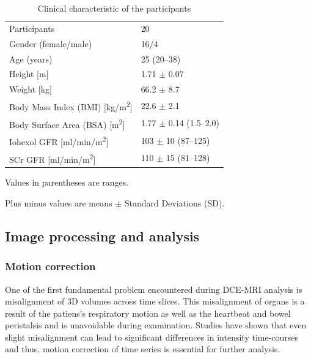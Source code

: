 \begin{table}[h!]
\centering
\caption[Clinical characteristic of the participants]{Clinical characteristic of the participants \cite{eikefjord2017dynamic}}
\label{tab:participants}
\begin{threeparttable}
\renewcommand{\arraystretch}{1.25}
\begin{tabular}{m{7cm} m{4cm}}
	\toprule

 	Participants & 20\\
  	Gender (female/male) &16/4\\
  	Age (years) & 25 (20--38)\\
  	Height [m] & 1.71 $\pm$ 0.07\\
  	Weight [kg] & 66.2 $\pm$ 8.7\\
  	Body Mass Index (BMI) [kg/m\textsuperscript{2}] & 22.6 $\pm$ 2.1\\
  	Body Surface Area (BSA) [m\textsuperscript{2}]& 1.77 $\pm$ 0.14 (1.5--2.0) \\
  	Iohexol GFR [ml/min/m\textsuperscript{2}] &103 $\pm$ 10 (87--125)\\
  	SCr GFR [ml/min/m\textsuperscript{2}] & 110 $\pm$ 15 (81--128)\\
  \bottomrule

\end{tabular}
\begin{tablenotes}%
\footnotesize{}%
\item Values in parentheses are ranges.
\item Plus minus values are means $\pm$ Standard Deviations (SD).
    \end{tablenotes}
	\end{threeparttable}
\end{table}

\subsection{Image processing and analysis}

\subsubsection{Motion correction}
One of the first fundamental problem encountered during DCE-MRI analysis is misalignment of 3D volumes across time slices. This misalignment of organs is a result of the patiens's respiratory motion as well as the heartbeat and bowel peristalsis and is unavoidable during examination. Studies have shown that even slight misalignment can lead to significant differences in intensity time-courses \cite{KidneySubsegmentation} and thus, motion correction of time series is essential for further analysis.

